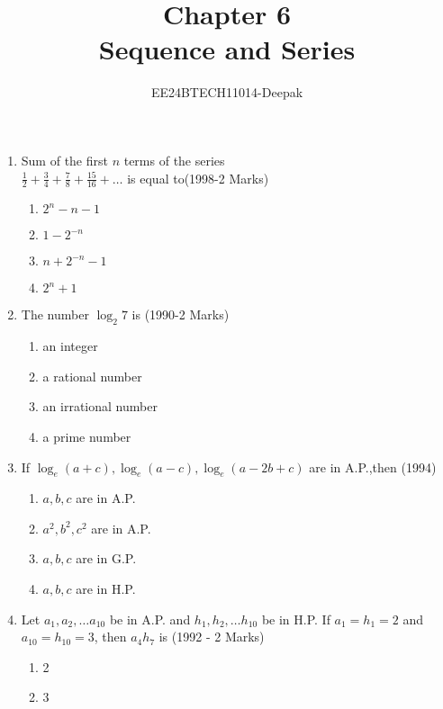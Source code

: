 \documentclass[journal,12pt,twocolumn]{IEEEtran}
\theoremstyle{remark}
\begin{document}

\vspace{3cm}

\title{Chapter 6 \\Sequence and Series}
\author{EE24BTECH11014-Deepak}
\maketitle
\newpage
\bigskip

\renewcommand{\thefigure}{\theenumi}
\renewcommand{\thetable}{\theenumi}
\begin{enumerate}
    \item Sum of the first $ n$ terms of the series \\
$ \frac{1}{2}+ \frac{3}{4}+ \frac{7}{8}+ \frac{15}{16}+ \dots $ is equal to\hfill (1998-2 Marks)
\begin{enumerate}
    \item $2^n-n-1$  
    \item $1-2^{-n}$
    \item $n+2^{-n}-1$
    \item $2^n+1$
    \end{enumerate}
\item The number ${\log_2}7$ is \hfill(1990-2 Marks)
    \begin{enumerate}
        \item an integer
        \item a rational number
        \item an irrational number
        \item a prime number
    \end{enumerate}
\item If $\log_e(a+c),\log_e(a-c),\log_e(a-2b+c)$ are in A.P.,then \hfill (1994)
    \begin{enumerate}
        \item $a,b,c$ are in A.P.
        \item $a^2,b^2,c^2$ are in A.P.
        \item $a,b,c$ are in G.P.
        \item $a,b,c$ are in H.P.
    \end{enumerate}
\item Let ${a_1,a_2,\dots a_{10}}$ be in A.P. and ${h_1,h_2, \dots h_{10}}$ be in H.P. If ${a_1}={h_1}=2$ and ${a_{10}}={h_{10}}=3$, then ${a_4h_7}$ is \hfill(1992 - 2 Marks)
    \begin{enumerate}
        \item 2
        \item 3

\end{enumerate}
\end{enumerate}
\end{document}
